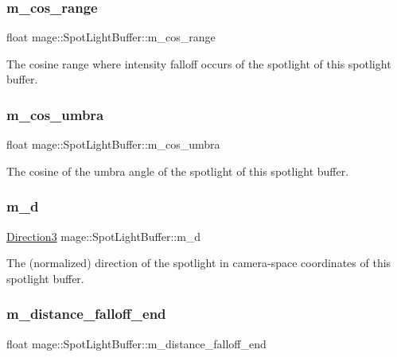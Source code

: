 \subsubsection{\texorpdfstring{m\+\_\+cos\+\_\+range}{m\_cos\_range}}
{\footnotesize\ttfamily float mage\+::\+Spot\+Light\+Buffer\+::m\+\_\+cos\+\_\+range}

The cosine range where intensity falloff occurs of the spotlight of this spotlight buffer. \hypertarget{structmage_1_1_spot_light_buffer_a7a7a02e7ddfaf96c90395cd21a6c0a91}{}\label{structmage_1_1_spot_light_buffer_a7a7a02e7ddfaf96c90395cd21a6c0a91} 
\subsubsection{\texorpdfstring{m\+\_\+cos\+\_\+umbra}{m\_cos\_umbra}}
{\footnotesize\ttfamily float mage\+::\+Spot\+Light\+Buffer\+::m\+\_\+cos\+\_\+umbra}

The cosine of the umbra angle of the spotlight of this spotlight buffer. \hypertarget{structmage_1_1_spot_light_buffer_aaa8d493a4bc458040588561c76547b97}{}\label{structmage_1_1_spot_light_buffer_aaa8d493a4bc458040588561c76547b97} 
\subsubsection{\texorpdfstring{m\+\_\+d}{m\_d}}
{\footnotesize\ttfamily \hyperlink{structmage_1_1_direction3}{Direction3} mage\+::\+Spot\+Light\+Buffer\+::m\+\_\+d}

The (normalized) direction of the spotlight in camera-\/space coordinates of this spotlight buffer. \hypertarget{structmage_1_1_spot_light_buffer_ae49f16cc01db734c72f02c963d89d0c2}{}\label{structmage_1_1_spot_light_buffer_ae49f16cc01db734c72f02c963d89d0c2} 
\subsubsection{\texorpdfstring{m\+\_\+distance\+\_\+falloff\+\_\+end}{m\_distance\_falloff\_end}}
{\footnotesize\ttfamily float mage\+::\+Spot\+Light\+Buffer\+::m\+\_\+distance\+\_\+falloff\+\_\+end}

